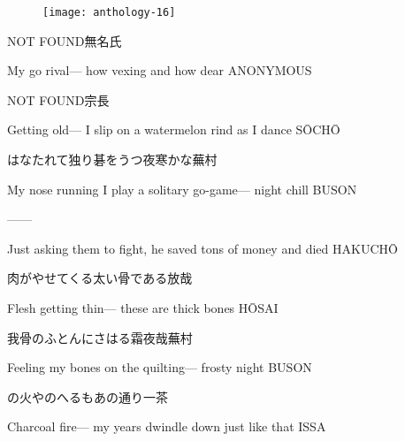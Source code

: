 \begin{figure}
    \texttt{[image: anthology-16]}
\end{figure}

\begin{haiku}
    {NOT FOUND}\hfill{\FH 無名氏}

    \vin{} My go rival---
    \vin{} \vin{} how vexing
    \vin{} \vin{} \vin{} and how dear \hspace{\fill} ANONYMOUS
\end{haiku}

\begin{haiku}
    {NOT FOUND}\hfill{\FH 宗長}

    \vin{} Getting old---
    \vin{} \vin{} I slip on a watermelon rind
    \vin{} \vin{} \vin{} as I dance \hspace{\fill} S\={O}CH\={O}
\end{haiku}

\begin{haiku}
    {\FH はなたれて独り碁をうつ夜寒かな}\hfill{\FH 蕪村}

    \vin{} My nose running
    \vin{} \vin{} I play a solitary go-game---
    \vin{} \vin{} \vin{} night chill \hspace{\fill} BUSON
\end{haiku}

\begin{haiku}
   ---\hfill{---}

    \vin{} Just asking them to fight,
    \vin{} \vin{} he saved tons of money
    \vin{} \vin{} \vin{} and died \hspace{\fill} HAKUCH\={O}
\end{haiku}

\begin{haiku}
    {\FH 肉がやせてくる太い骨である}\hfill{\FH 放哉}

    \vin{} Flesh getting thin---
    \vin{} \vin{} these are thick bones \hspace{\fill} H\={O}SAI
\end{haiku}

\begin{haiku}
    {\FH 我骨のふとんにさはる霜夜哉}\hfill{\FH 蕪村}

    \vin{} Feeling my bones
    \vin{} \vin{} on the quilting---
    \vin{} \vin{} \vin{} frosty night \hspace{\fill} BUSON
\end{haiku}

\begin{haiku}
    {\FH {}の火やのへるもあの通り}\hfill{\FH 一茶}

    \vin{} Charcoal fire---
    \vin{} \vin{} my years dwindle down
    \vin{} \vin{} \vin{} just like that \hspace{\fill} ISSA
\end{haiku}

